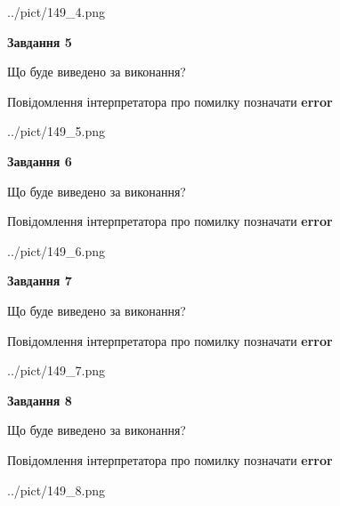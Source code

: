 \documentclass[12pt, ukrainian]{article}
\begin{document}
{\begin{center}
	{../pict/149_4.png}
\end{center}
\newpage

{\begin {center}\textbf{Завдання 5}\end {center}}\par
Що буде виведено за виконання? \par
Повідомлення інтерпретатора про помилку позначати \textbf{error}

\begin{center}
	{../pict/149_5.png}
\end{center}
\newpage

{\begin {center}\textbf{Завдання 6}\end {center}}\par
Що буде виведено за виконання? \par
Повідомлення інтерпретатора про помилку позначати \textbf{error}

\begin{center}
	{../pict/149_6.png}
\end{center}
\newpage

{\begin {center}\textbf{Завдання 7}\end {center}}\par
Що буде виведено за виконання? \par
Повідомлення інтерпретатора про помилку позначати \textbf{error}

\begin{center}
	{../pict/149_7.png}
\end{center}
\newpage

{\begin {center}\textbf{Завдання 8}\end {center}}\par
Що буде виведено за виконання? \par
Повідомлення інтерпретатора про помилку позначати \textbf{error}

\begin{center}
	{../pict/149_8.png}
\end{center}
\newpage

}
\end{document}

